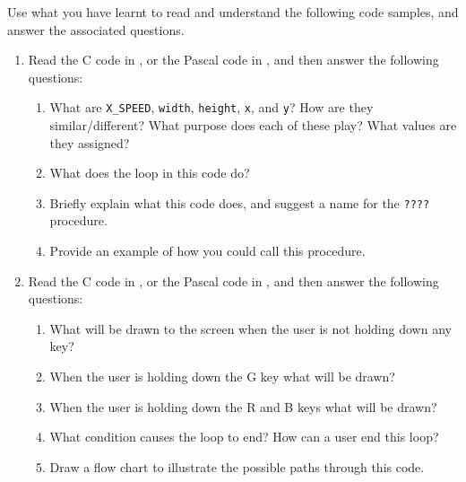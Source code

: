 Use what you have learnt to read and understand the following code samples, and answer the associated questions.
\begin{enumerate}
  \item Read the C code in , or the Pascal code in , and then answer the following questions:
  \begin{enumerate}
    \item What are \texttt{X\_SPEED}, \texttt{width}, \texttt{height}, \texttt{x}, and \texttt{y}? How are they similar/different? What purpose does each of these play? What values are they assigned?
    \item What does the loop in this code do?
    \item Briefly explain what this code does, and suggest a name for the \texttt{????} procedure.
    \item Provide an example of how you could call this procedure.
  \end{enumerate}
  
  \begin{figure}[h]
  \end{figure}
  \begin{figure}[h]
  \end{figure}
  
  \item Read the C code in , or the Pascal code in , and then answer the following questions:
  \begin{enumerate}
    \item What will be drawn to the screen when the user is not holding down any key?
    \item When the user is holding down the G key what will be drawn?
    \item When the user is holding down the R and B keys what will be drawn?
    \item What condition causes the loop to end? How can a user end this loop?
    \item Draw a flow chart to illustrate the possible paths through this code.
  \end{enumerate}
  \begin{figure}[h]
  \end{figure}
  \begin{figure}[h]
  \end{figure}
  \clearpage
  

\end{enumerate}
